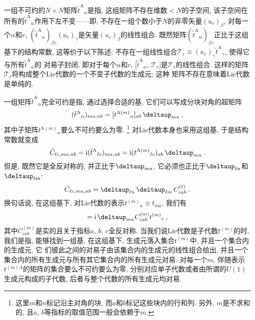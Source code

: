 一组不可约的$N\times N$矩阵$\tilde{t}^{\mathrm{A}}{}_{\alpha }$是指, 这组矩阵不存在维数$<N$的子空间, 
该子空间在所有的$\tilde{t}^{\mathrm{A}}{}_{\alpha }$作用下左不变------即, 不存在一组个数小于$N$的非零矢量$(u_{r})_{\beta }$, 
对每一个$\alpha $和$r$, $(\tilde{t}^{\mathrm{A}}{}_{\alpha })_{\beta
\gamma }(u_{r})_{\gamma }$是矢量$(u_{s})_{\beta }$的线性组合. 既然矩阵$(\tilde{t}%
^{\mathrm{A}}{}_{\alpha })_{\beta \gamma }$正比于这组基下的结构常数, 这等价于以下陈述: 
不存在一组线性组合$\mathscr{T}_{r}\equiv
(u_{r})_{\gamma }\tilde{t}^{\mathrm{A}}{}_{\gamma }$, 使得它与所有$\tilde{t}^{\mathrm{A}}{}_{\alpha }$的%
对易子封闭, 即对于每个$\alpha $和$r$, $[\tilde{t}^{\mathrm{A}}{}_{\alpha }$, $\mathscr{T}_{r}]
$是$\mathscr{T}_{s}$的线性组合. 这样的矩阵$\mathscr{T}_{r}$将构成整个Lie代数的一个不变子代数的生成元; 这种%
矩阵不存在意味着Lie代数是单纯的.

一组矩阵$\tilde{t}^{\mathrm{A}}{}_{\alpha }$完全可约是指, 通过选择合适的基, 它们可以写成分块对角的超矩阵%
\begin{equation}
(\tilde{t}^{\mathrm{A}}{}_{\alpha })_{ma,nb}=[t^{\mathrm{A}(m)}{}_{\alpha
}]_{ab}\,\deltaup _{mn}\:,   \label{15.A.6}
\end{equation}%
其中子矩阵$t^{\mathrm{A}(m)}{}_{\alpha }$要么不可约要么为零.%
\footnote{这里$m$和$n$标记沿主对角的块, 而$a$和$b$标记这些块内的行和列. 另外, $m$是不求和的,
且$a$, $b$等指标的取值范围一般会依赖于$m$.} 对Lie代数本身也采用这组基, 于是结构常数就变成
\begin{equation}
\tilde{C}_{\ell c,ma,nb}=\mi(\tilde{t}^{\mathrm{A}}{}_{\ell c})_{ma,nb}=\mi%
(t^{\mathrm{A}(m)}{}_{\ell c})_{ab}\,\deltaup _{mn}\:.   \label{15.A.7}
\end{equation}%
但是, 既然它是全反对称的, 并正比于$\deltaup _{mn}$, 它必须也正比于$\deltaup _{\ell n}$和$\deltaup _{\ell m}$:%
\begin{equation}
\tilde{C}_{\ell c,ma,nb}=\deltaup  _{\ell n}\,\deltaup  _{\ell m}\,C_{cab}^{(\ell )}\:.   \label{15.A.8}
\end{equation}%
换句话说, 在这组基下, 对Lie代数的{}表示$t^{(m)}{}_{a}\equiv t_{ma}$, 我们有
\begin{equation}
[ t^{(m)}{}_{a},t^{(m)}{}_{b}]=\mi\,\deltaup_{mn}C_{cab}^{(m)}t^{(m)}{}_{c}\:,   \label{15.A.9}
\end{equation}%
其中$C_{cab}^{(m)}$是实的且关于指标$a$, $b$, $c$全反对称. 当我们说Lie代数是子代数$%
t^{(m)}$的{}时, 我们是指, 能够找到一组基, 在这组基下, 生成元落入集合$t^{(m)}$中, 并且一个集合内的生成元, 它%
们彼此之间的对易子由该集合内的生成元的线性组合给出, 并且一个集合内的所有生成元与所有其它集合内的所有生成元对易.
对每一个$m$, 伴随表示$t^{(m)A}$的矩阵的集合要么不可约要么为零, 分别对应单子代数或者由所谓的$U(1)$生成元构成的子代数, 
后者与整个代数的所有生成元均对易.


